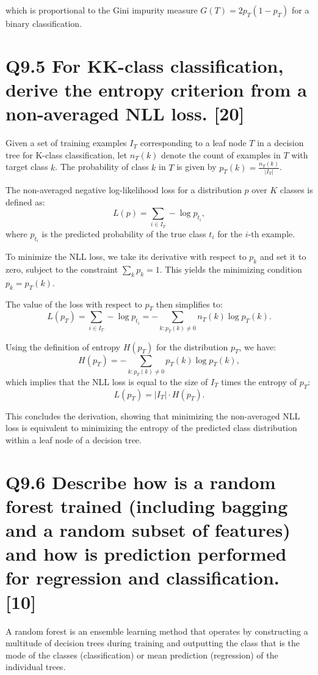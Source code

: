 \documentclass[11pt]{article}
\begin{document}
which is proportional to the Gini impurity measure \( G(T) = 2p_T(1 - p_T) \) for a binary classification.

\section{Q9.5 For KK-class classification, derive the entropy criterion from a non-averaged NLL loss. [20]}

Given a set of training examples \(I_T\) corresponding to a leaf node \(T\) in a decision tree for K-class classification, let \(n_T(k)\) denote the count of examples in \(T\) with target class \(k\). The probability of class \(k\) in \(T\) is given by \(p_T(k) = \frac{n_T(k)}{|I_T|}\).

The non-averaged negative log-likelihood loss for a distribution \(p\) over \(K\) classes is defined as:
\[
L(p) = \sum_{i \in I_T} -\log p_{t_i},
\]
where \(p_{t_i}\) is the predicted probability of the true class \(t_i\) for the \(i\)-th example.

To minimize the NLL loss, we take its derivative with respect to \(p_k\) and set it to zero, subject to the constraint \(\sum_k p_k = 1\). This yields the minimizing condition \(p_k = p_T(k)\).

The value of the loss with respect to \(p_T\) then simplifies to:
\[
L(p_T) = \sum_{i \in I_T} -\log p_{t_i} = -\sum_{k: p_T(k) \neq 0} n_T(k) \log p_T(k).
\]

Using the definition of entropy \(H(p_T)\) for the distribution \(p_T\), we have:
\[
H(p_T) = -\sum_{k: p_T(k) \neq 0} p_T(k) \log p_T(k),
\]
which implies that the NLL loss is equal to the size of \(I_T\) times the entropy of \(p_T\):
\[
L(p_T) = |I_T| \cdot H(p_T).
\]

This concludes the derivation, showing that minimizing the non-averaged NLL loss is equivalent to minimizing the entropy of the predicted class distribution within a leaf node of a decision tree.

\section{Q9.6 Describe how is a random forest trained (including bagging and a random subset of features) and how is prediction performed for regression and classification. [10]}

A random forest is an ensemble learning method that operates by constructing a multitude of decision trees during training and outputting the class that is the mode of the classes (classification) or mean prediction (regression) of the individual trees.
\end{document}
